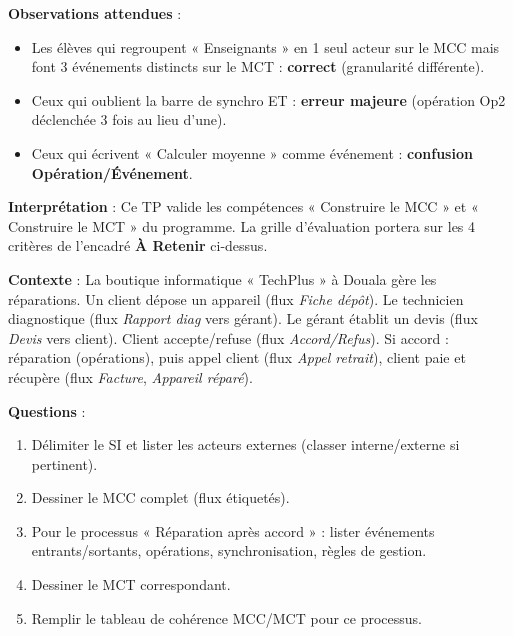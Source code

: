 \documentclass[11pt]{article}
\begin{document}
\begin{experience}
\textbf{Observations attendues} :
\begin{itemize}
    \item Les élèves qui regroupent « Enseignants » en 1 seul acteur sur le MCC mais font 3 événements distincts sur le MCT : \textbf{correct} (granularité différente).
    \item Ceux qui oublient la barre de synchro ET : \textbf{erreur majeure} (opération Op2 déclenchée 3 fois au lieu d'une).
    \item Ceux qui écrivent « Calculer moyenne » comme événement : \textbf{confusion Opération/Événement}.
\end{itemize}

\textbf{Interprétation} : Ce TP valide les compétences « Construire le MCC » et « Construire le MCT » du programme. La grille d'évaluation portera sur les 4 critères de l'encadré \textbf{À Retenir} ci-dessus.
\end{experience}

\begin{exercice}
\textbf{Contexte} : La boutique informatique « TechPlus » à Douala gère les réparations. Un client dépose un appareil (flux \emph{Fiche dépôt}). Le technicien diagnostique (flux \emph{Rapport diag} vers gérant). Le gérant établit un devis (flux \emph{Devis} vers client). Client accepte/refuse (flux \emph{Accord/Refus}). Si accord : réparation (opérations), puis appel client (flux \emph{Appel retrait}), client paie et récupère (flux \emph{Facture}, \emph{Appareil réparé}).

\textbf{Questions} :
\begin{enumerate}
    \item Délimiter le SI et lister les acteurs externes (classer interne/externe si pertinent).
    \item Dessiner le MCC complet (flux étiquetés).
    \item Pour le processus « Réparation après accord » : lister événements entrants/sortants, opérations, synchronisation, règles de gestion.
    \item Dessiner le MCT correspondant.
    \item Remplir le tableau de cohérence MCC/MCT pour ce processus.
\end{enumerate}
\end{exercice}
\end{document}
